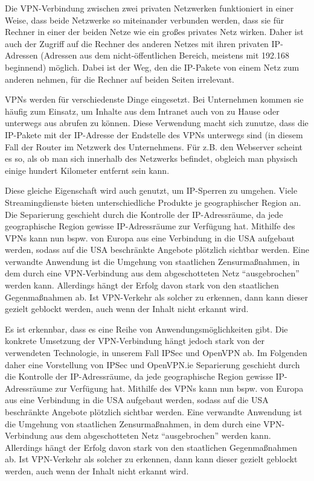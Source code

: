 \documentclass[12pt]{scrartcl}
\begin{document}
Die VPN-Verbindung zwischen zwei privaten Netzwerken funktioniert in einer Weise, dass beide Netzwerke so miteinander verbunden werden, dass sie für Rechner in einer der beiden Netze wie ein großes privates Netz wirken. Daher ist auch der Zugriff auf die Rechner des anderen Netzes mit ihren privaten IP-Adressen (Adressen aus dem nicht-öffentlichen Bereich, meistens mit 192.168 beginnend) möglich. Dabei ist der Weg, den die IP-Pakete von einem Netz zum anderen nehmen, für die Rechner auf beiden Seiten irrelevant.

VPNs werden für verschiedenste Dinge eingesetzt. Bei Unternehmen kommen sie häufig zum Einsatz, um Inhalte aus dem Intranet auch von zu Hause oder unterwegs aus abrufen zu können. Diese Verwendung macht sich zunutze, dass die IP-Pakete mit der IP-Adresse der Endstelle des VPNs unterwegs sind (in diesem Fall der Router im Netzwerk des Unternehmens. Für z.B. den Webserver scheint es so, als ob man sich innerhalb des Netzwerks befindet, obgleich man physisch einige hundert Kilometer entfernt sein kann.

Diese gleiche Eigenschaft wird auch genutzt, um IP-Sperren zu umgehen. Viele Streamingdienste bieten unterschiedliche Produkte je geographischer Region an. Die Separierung geschieht durch die Kontrolle der IP-Adressräume, da jede geographische Region gewisse IP-Adressräume zur Verfügung hat. Mithilfe des VPNs kann nun bspw. von Europa aus eine Verbindung in die USA aufgebaut werden, sodass auf die USA beschränkte Angebote plötzlich sichtbar werden. Eine verwandte Anwendung ist die Umgehung von staatlichen Zensurmaßnahmen, in dem durch eine VPN-Verbindung aus dem abgeschotteten Netz "`ausgebrochen"' werden kann. Allerdings hängt der Erfolg davon stark von den staatlichen Gegenmaßnahmen ab. Ist VPN-Verkehr als solcher zu erkennen, dann kann dieser gezielt geblockt werden, auch wenn der Inhalt nicht erkannt wird.

Es ist erkennbar, dass es eine Reihe von Anwendungsmöglichkeiten gibt. Die konkrete Umsetzung der VPN-Verbindung hängt jedoch stark von der verwendeten Technologie, in unserem Fall IPSec und OpenVPN ab. Im Folgenden daher eine Vorstellung von IPSec und OpenVPN.ie Separierung geschieht durch die Kontrolle der IP-Adressräume, da jede geographische Region gewisse IP-Adressräume zur Verfügung hat. Mithilfe des VPNs kann nun bspw. von Europa aus eine Verbindung in die USA aufgebaut werden, sodass auf die USA beschränkte Angebote plötzlich sichtbar werden. Eine verwandte Anwendung ist die Umgehung von staatlichen Zensurmaßnahmen, in dem durch eine VPN-Verbindung aus dem abgeschotteten Netz "`ausgebrochen"' werden kann. Allerdings hängt der Erfolg davon stark von den staatlichen Gegenmaßnahmen ab. Ist VPN-Verkehr als solcher zu erkennen, dann kann dieser gezielt geblockt werden, auch wenn der Inhalt nicht erkannt wird.
\end{document}
